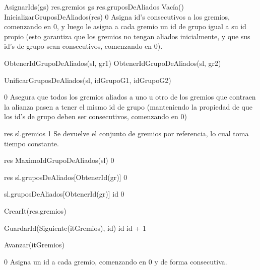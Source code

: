 {
	\state AsignarIds(gs)
	\state res.gremios \asig gs 						
	\state
	\state res.gruposDeAliados \asig Vacía()			
	\state InicializarGruposDeAliados(res)
}
{0}
{Asigna id's consecutivos a los gremios, comenzando en 0, y luego le asigna a cada gremio un id de grupo igual a su id propio (esto garantiza que los gremios no tengan aliados inicialmente, y que sus id's de grupo sean consecutivos, comenzando en 0). }

{
	\state {} \asig ObtenerIdGrupoDeAliados(sl, gr1)			
	\state {} \asig ObtenerIdGrupoDeAliados(sl, gr2)			
	\state 

													
		\state UnificarGruposDeAliados(sl, idGrupoG1, idGrupoG2)					
	\endif
}
{0}
{ Asegura que todos los gremios aliados a uno u otro de los gremios que contraen la alianza pasen a tener el mismo id de grupo (manteniendo la propiedad de que los id's de grupo deben ser consecutivos, comenzando en 0) }

{
	\state res \asig sl.gremios								
}
{1}
{ Se devuelve el conjunto de gremios por referencia, lo cual toma tiempo constante. }

{
	\state res \asig MaximoIdGrupoDeAliados(sl)			
}
{0}
{}

{
	\state res \asig sl.gruposDeAliados[ObtenerId(gr)]			
}
{0}
{}

{
	\state sl.gruposDeAliados[ObtenerId(gr)] \asig id			
}
{0}
{}

{
	\state {} 											
	\state

	\state {} \asig CrearIt(res.gremios)		
		\state
		
		\state GuardarId(Siguiente(itGremios), id)							
		\state id \asig id + 1												
		
		\state
		\state Avanzar(itGremios)											
	\endwhile
}
{0}
{ Asigna un id a cada gremio, comenzando en 0 y de forma consecutiva. }


